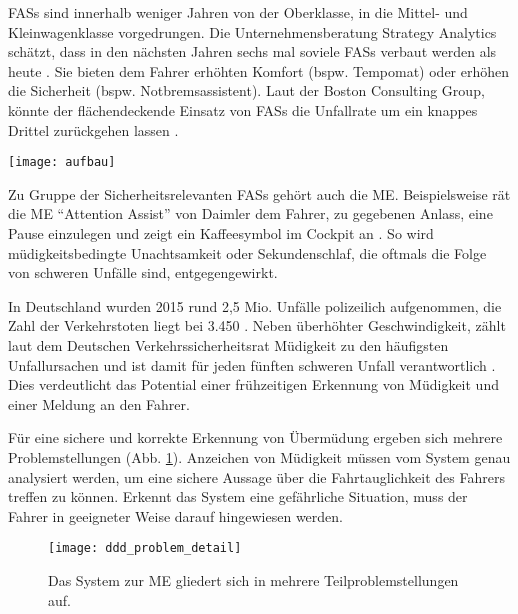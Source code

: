 \label{chap:intro}

\acl{FASs} sind innerhalb weniger Jahren von der Oberklasse, in die Mittel-  und Kleinwagenklasse vorgedrungen. Die Unternehmensberatung Strategy Analytics schätzt, dass in den nächsten Jahren sechs mal soviele \acl{FASs} verbaut werden als heute \cite{strategy_analytics}. Sie bieten dem Fahrer erhöhten Komfort (bspw. Tempomat) oder erhöhen die Sicherheit (bspw. Notbremsassistent). Laut der Boston Consulting Group, könnte der flächendeckende Einsatz von \acl{FASs} die Unfallrate um ein knappes Drittel zurückgehen lassen \cite{bcgperspectives}. 

\begin{figure*} 
  \begin{center}
    \texttt{[image: aufbau]}
    \caption[Skizze des Systemaufbaus]{Skizze des Systemaufbaus: \acl{BS} (Elektroenzephalografie / Elektrokardiogramm) liefert Daten an die Applikation und ein Feedback-Device warnt den müden Fahrer. Bild zeigt den Fahrsimulator der \acl{RTU}. \label{fig:sketch}}
  \end{center}
\end{figure*}

Zu Gruppe der Sicherheitsrelevanten \acl{FASs} gehört auch die \acl{ME}. Beispielsweise rät die \acl{ME} "`Attention Assist"' von Daimler dem Fahrer, zu gegebenen Anlass, eine Pause einzulegen und zeigt ein Kaffeesymbol im Cockpit an \cite{Daimler}. So wird müdigkeitsbedingte Unachtsamkeit oder Sekundenschlaf, die oftmals die Folge von schweren Unfälle sind, entgegengewirkt.

In Deutschland wurden 2015 rund 2,5 Mio. Unfälle polizeilich aufgenommen, die Zahl der Verkehrstoten liegt bei 3.450 \cite{accident_statistic}. Neben überhöhter Geschwindigkeit, zählt laut dem Deutschen Verkehrssicherheitsrat Müdigkeit zu den häufigsten Unfallursachen und ist damit für jeden fünften schweren Unfall verantwortlich \cite{dvr_statistic}. Dies verdeutlicht das Potential einer frühzeitigen Erkennung von Müdigkeit und einer Meldung an den Fahrer.

Für eine sichere und korrekte Erkennung von Übermüdung ergeben sich mehrere Problemstellungen (Abb. \ref{fig:ddd_problem}). Anzeichen von Müdigkeit müssen vom System genau analysiert werden, um eine sichere Aussage über die Fahrtauglichkeit des Fahrers treffen zu können. Erkennt das System eine gefährliche Situation, muss der Fahrer in geeigneter Weise darauf hingewiesen werden.

\begin{figure}[h] 
  \begin{center}
    \texttt{[image: ddd\_problem\_detail]}
    \caption[Problemstellung der Müdigkeitserkennung]{Das System zur \acl{ME} gliedert sich in mehrere Teilproblemstellungen auf.\label{fig:ddd_problem}}
  \end{center}
\end{figure}


